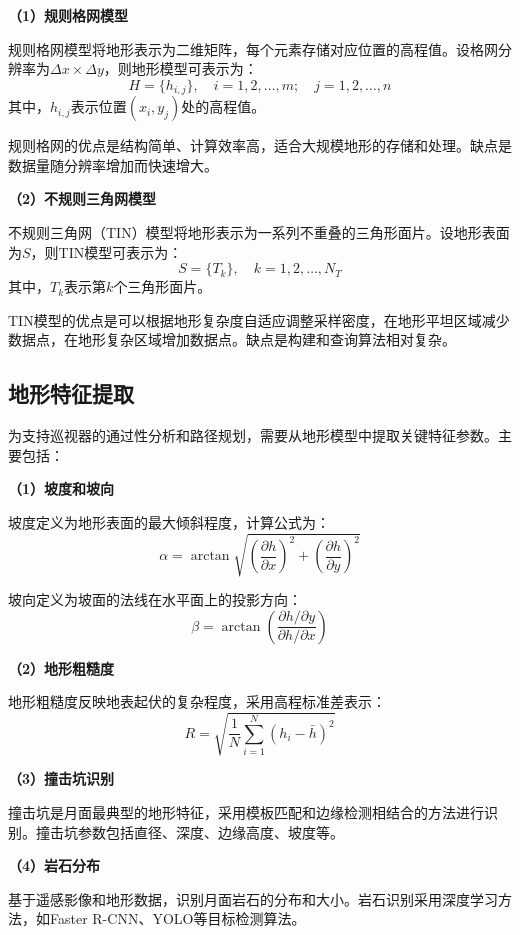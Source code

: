 \textbf{（1）规则格网模型}

规则格网模型将地形表示为二维矩阵，每个元素存储对应位置的高程值。设格网分辨率为$\Delta x \times \Delta y$，则地形模型可表示为：
\begin{equation}
    H = \{h_{i,j}\}, \quad i = 1, 2, \ldots, m; \quad j = 1, 2, \ldots, n
    \label{eq:grid_model}
\end{equation}
其中，$h_{i,j}$表示位置$(x_i, y_j)$处的高程值。

规则格网的优点是结构简单、计算效率高，适合大规模地形的存储和处理。缺点是数据量随分辨率增加而快速增大。

\textbf{（2）不规则三角网模型}

不规则三角网（TIN）模型将地形表示为一系列不重叠的三角形面片。设地形表面为$S$，则TIN模型可表示为：
\begin{equation}
    S = \{T_k\}, \quad k = 1, 2, \ldots, N_T
    \label{eq:tin_model}
\end{equation}
其中，$T_k$表示第$k$个三角形面片。

TIN模型的优点是可以根据地形复杂度自适应调整采样密度，在地形平坦区域减少数据点，在地形复杂区域增加数据点。缺点是构建和查询算法相对复杂。

\subsection{地形特征提取}
\label{subsec:terrain_features}

为支持巡视器的通过性分析和路径规划，需要从地形模型中提取关键特征参数。主要包括：

\textbf{（1）坡度和坡向}

坡度定义为地形表面的最大倾斜程度，计算公式为：
\begin{equation}
    \alpha = \arctan\sqrt{\left(\frac{\partial h}{\partial x}\right)^2 + \left(\frac{\partial h}{\partial y}\right)^2}
    \label{eq:slope}
\end{equation}

坡向定义为坡面的法线在水平面上的投影方向：
\begin{equation}
    \beta = \arctan\left(\frac{\partial h / \partial y}{\partial h / \partial x}\right)
    \label{eq:aspect}
\end{equation}

\textbf{（2）地形粗糙度}

地形粗糙度反映地表起伏的复杂程度，采用高程标准差表示：
\begin{equation}
    R = \sqrt{\frac{1}{N}\sum_{i=1}^{N}(h_i - \bar{h})^2}
    \label{eq:roughness}
\end{equation}

\textbf{（3）撞击坑识别}

撞击坑是月面最典型的地形特征，采用模板匹配和边缘检测相结合的方法进行识别。撞击坑参数包括直径、深度、边缘高度、坡度等。

\textbf{（4）岩石分布}

基于遥感影像和地形数据，识别月面岩石的分布和大小。岩石识别采用深度学习方法，如Faster R-CNN、YOLO等目标检测算法。
